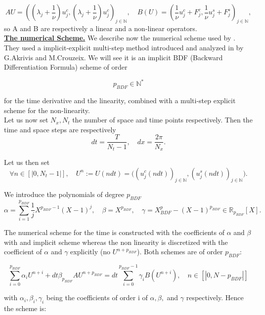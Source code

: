 \documentclass[12pt]{article}
\begin{document}
$$AU = \left((\lambda_j + \frac{1}{\nu})u^c_j, (\lambda_j + \frac{1}{\nu})u^c_j\right)_{j \in \mathbb{N}}, \quad B(U) = 
\left(\frac{1}{\nu}u_j^c + F_j^c, \frac{1}{\nu}u_j^s + F_j^s\right)_{j\in \mathbb{N}},$$
so A and B are respectively a linear and a non-linear operators.
\\

\underline{\textbf{The numerical Scheme.}} We describe now the numerical scheme used by \cite{Scheme_for_KS}. 
They used a implicit-explicit multi-step method introduced and analyzed in \cite{KS_scheme_C_A} by G.Akrivis and M.Crouzeix. 
We will see it is an implicit BDF (Backward 
 Differentiation Formula) scheme of order 

\begin{equation}
    p_{BDF} \in \mathbb{N}^*
\end{equation} 

for the time derivative and the linearity, combined with a multi-step explicit scheme for the non-linearity. 
\\

Let us now set $N_x, N_t$ the number of space and time points respectively. Then the time and space steps are respectively 
$$dt = \frac{T}{N_t-1},\quad dx = \frac{2\pi}{N_x}.$$ 

Let us then set $$\forall n\in [|0, N_t-1|], \quad U^n := U(ndt) = \Big( (u_j^c(ndt))_{j\in \mathbb{N}}, (u_j^s(ndt))_{j\in \mathbb{N}}\Big).$$

We introduce the polynomials of degree $p_{BDF}$
 \begin{equation}
     \alpha = \sum_{i=1}^{p_{BDF}} \frac{1}{j}X^{p_{BDF}-1}(X-1)^j, \quad  \beta = X^{p_{BDF}}, \quad \gamma = X^p_{BDF} - (X-1)^{p_{BDF}} \in \mathbb{R}_{p_{BDF}}[X].
 \end{equation}

The numerical scheme for the time is constructed with the coefficients of $\alpha$ and $\beta$ with and implicit scheme whereas the non
 linearity is discretized with the coefficient of $\alpha$ and $\gamma$ explicitly (no $U^{n+p_{BDF}}$). Both schemes are of order $p_{BDF}$:

\begin{equation}
    \sum_{i=0}^{p_{BDF}} \alpha_i U^{n+i} + dt\beta_{p_{BDF}}AU^{n+p_{BDF}} = dt\sum_{i=0}^{p_{BDF}-1} \gamma_iB(U^{n+i}), \quad n\in [|0, N-p_{BDF}|]
\end{equation}

with $\alpha_i, \beta_i, \gamma_i$ being the coefficients of order i of $\alpha, \beta,$ and $\gamma$ respectively. Hence the scheme is: 
\\
\end{document}
